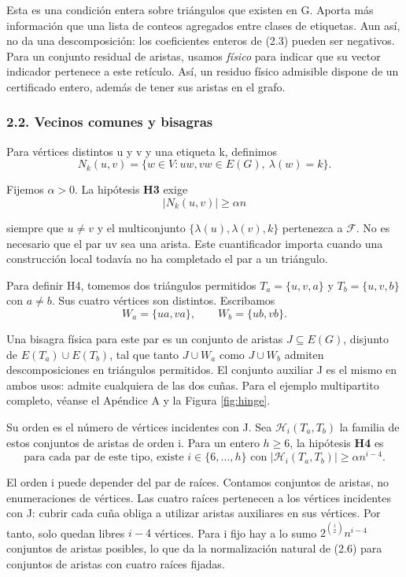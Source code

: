 \documentclass[spanish,11pt,a4paper]{article}
\begin{document}
Esta es una condición entera sobre triángulos que existen en G. Aporta más información que una lista de conteos agregados entre clases de etiquetas. Aun así, no da una descomposición: los coeficientes enteros de (2.3) pueden ser negativos. Para un conjunto residual de aristas, usamos \emph{físico} para indicar que su vector indicador pertenece a este retículo. Así, un residuo físico admisible dispone de un certificado entero, además de tener sus aristas en el grafo.

\subsubsection{2.2. Vecinos comunes y bisagras}\label{vecinos-comunes-y-bisagras}

Para vértices distintos u y v y una etiqueta k, definimos
\[N_k(u,v)=\{w\in V:uw,vw\in E(G),\ \lambda(w)=k\}.\]

Fijemos \(\alpha>0\). La hipótesis \textbf{H3} exige
\[|N_k(u,v)|\geq\alpha n                                      \tag{2.5}\]

siempre que \(u\ne v\) y el multiconjunto \(\{\lambda(u),\lambda(v),k\}\) pertenezca a \(\mathcal F\). No es necesario que el par uv sea una arista. Este cuantificador importa cuando una construcción local todavía no ha completado el par a un triángulo.

Para definir H4, tomemos dos triángulos permitidos \(T_a=\{u,v,a\}\) y \(T_b=\{u,v,b\}\) con \(a\ne b\). Sus cuatro vértices son distintos. Escribamos
\[W_a=\{ua,va\},\qquad W_b=\{ub,vb\}.\]

Una bisagra física para este par es un conjunto de aristas \(J\subseteq E(G)\), disjunto de \(E(T_a)\cup E(T_b)\), tal que tanto \(J\cup W_a\) como \(J\cup W_b\) admiten descomposiciones en triángulos permitidos. El conjunto auxiliar J es el mismo en ambos usos: admite cualquiera de las dos cuñas. Para el ejemplo multipartito completo, véanse el Apéndice A y la Figura \ref{fig:hinge}.

Su orden es el número de vértices incidentes con J. Sea \(\mathcal H_i(T_a,T_b)\) la familia de estos conjuntos de aristas de orden i. Para un entero \(h\geq6\), la hipótesis \textbf{H4} es
\[\text{para cada par de este tipo, existe }i\in\{6,\ldots,h\}
\text{ con }|\mathcal H_i(T_a,T_b)|\geq\alpha n^{i-4}.        \tag{2.6}\]

El orden i puede depender del par de raíces. Contamos conjuntos de aristas, no enumeraciones de vértices. Las cuatro raíces pertenecen a los vértices incidentes con J: cubrir cada cuña obliga a utilizar aristas auxiliares en sus vértices. Por tanto, solo quedan libres \(i-4\) vértices. Para i fijo hay a lo sumo \(2^{\binom{i}{2}}n^{i-4}\) conjuntos de aristas posibles, lo que da la normalización natural de (2.6) para conjuntos de aristas con cuatro raíces fijadas.
\end{document}
